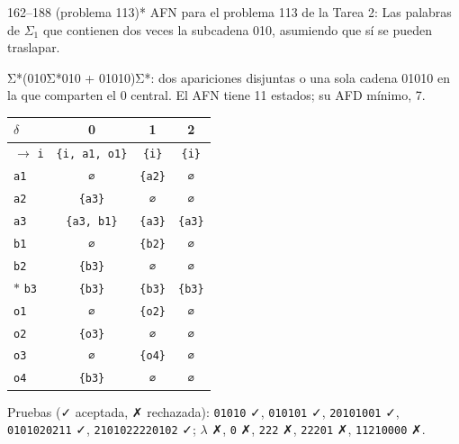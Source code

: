 \documentclass[11pt]{article}
\begin{document}
\begin{ejercicio}{162--188 (problema 113)}{*}
AFN para el problema 113 de la Tarea 2: Las palabras de $\Sigma_1$ que contienen dos veces la subcadena 010, asumiendo que sí se pueden traslapar.
\end{ejercicio}
\proc Σ*(010Σ*010 + 01010)Σ*: dos apariciones disjuntas o una sola cadena 01010 en la que comparten el 0 central. El AFN tiene 11 estados; su AFD mínimo, 7.
\begin{center}\small\begin{tabular}{lccc}\toprule
$\delta$ & 0 & 1 & 2 \\\midrule
$\to$ \texttt{i} & \texttt{\{i, a1, o1\}} & \texttt{\{i\}} & \texttt{\{i\}} \\
 \texttt{a1} & \texttt{∅} & \texttt{\{a2\}} & \texttt{∅} \\
 \texttt{a2} & \texttt{\{a3\}} & \texttt{∅} & \texttt{∅} \\
 \texttt{a3} & \texttt{\{a3, b1\}} & \texttt{\{a3\}} & \texttt{\{a3\}} \\
 \texttt{b1} & \texttt{∅} & \texttt{\{b2\}} & \texttt{∅} \\
 \texttt{b2} & \texttt{\{b3\}} & \texttt{∅} & \texttt{∅} \\
$*$ \texttt{b3} & \texttt{\{b3\}} & \texttt{\{b3\}} & \texttt{\{b3\}} \\
 \texttt{o1} & \texttt{∅} & \texttt{\{o2\}} & \texttt{∅} \\
 \texttt{o2} & \texttt{\{o3\}} & \texttt{∅} & \texttt{∅} \\
 \texttt{o3} & \texttt{∅} & \texttt{\{o4\}} & \texttt{∅} \\
 \texttt{o4} & \texttt{\{b3\}} & \texttt{∅} & \texttt{∅} \\
\bottomrule\end{tabular}\end{center}
Pruebas (✓ aceptada, ✗ rechazada): \texttt{01010} ✓, \texttt{010101} ✓, \texttt{20101001} ✓, \texttt{0101020211} ✓, \texttt{2101022220102} ✓; $\lambda$ ✗, \texttt{0} ✗, \texttt{222} ✗, \texttt{22201} ✗, \texttt{11210000} ✗.
\end{document}
